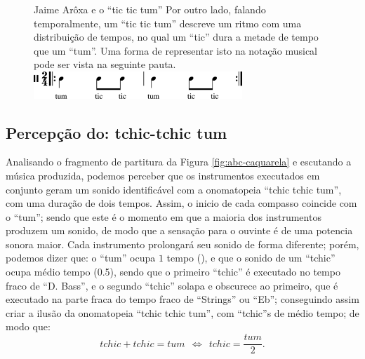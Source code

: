\begin{figure}[hb!]
\begin{elaboracion}{Jaime Arôxa e o ``tic tic tum''}
Por outro lado, falando temporalmente, um ``tic tic tum'' descreve um ritmo com uma distribuição de tempos, 
no qual um ``tic'' dura a metade de tempo que um ``tum''. 
Uma forma de representar isto na notação musical pode ser vista na seguinte pauta.\\

\centering
\href{https://drive.google.com/file/d/1CZaAP5lPzVX7oTT5EMpIKN-XbOUYUt3Y/view?usp=sharing}{\includegraphics[width=0.7\textwidth]{chapters/cap-musicalidade-percepcion/abc-tictictumaroxa-1.eps}}

\end{elaboracion}
\end{figure}


\subsection{Percepção do: tchic-tchic tum}

Analisando o fragmento de partitura da Figura \ref{fig:abc-caquarela} e escutando a música produzida, 
podemos perceber que os instrumentos executados em conjunto geram um sonido identificável
com a onomatopeia ``tchic tchic tum'', com uma duração de dois tempos.
Assim, o inicio de cada compasso coincide com o ``tum''; 
sendo que este é o momento em que a maioria dos instrumentos produzem um sonido, 
de modo que a sensação para o ouvinte é de uma potencia sonora maior. 
Cada instrumento prolongará seu sonido de forma diferente; 
porém,  podemos dizer que: o ``tum'' ocupa $1$ tempo (\quarternote), 
e que o sonido de um ``tchic'' ocupa médio tempo (0.5\quarternote),
sendo que o primeiro ``tchic'' é executado no tempo fraco de ``D. Bass'', 
e o segundo ``tchic'' solapa e obscurece ao  primeiro, 
que é executado na parte fraca do tempo fraco de ``Strings'' ou ``Eb'';
conseguindo assim criar a ilusão da onomatopeia ``tchic tchic tum'', 
com ``tchic''s de médio tempo; de modo que:
\begin{equation}
tchic + tchic = tum ~~ \Longleftrightarrow ~~ tchic = \frac{tum}{2}.
\end{equation}
 
